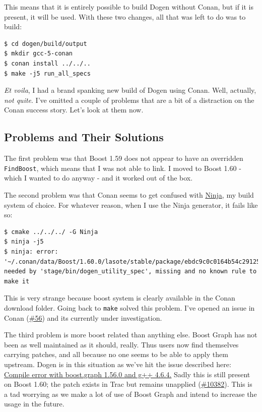 \documentclass{book}
\begin{document}
This means that it is entirely possible to build Dogen without Conan,
but if it is present, it will be used. With these two changes, all
that was left to do was to build:

\begin{verbatim}
$ cd dogen/build/output
$ mkdir gcc-5-conan
$ conan install ../../..
$ make -j5 run_all_specs
\end{verbatim}

\emph{Et voila}, I had a brand spanking new build of Dogen using
Conan. Well, actually, \emph{not quite}. I've omitted a couple of problems
that are a bit of a distraction on the Conan success story. Let's look
at them now.

\subsection*{Problems and Their Solutions}
\label{sec-3-2}

The first problem was that Boost 1.59 does not appear to have an
overridden \texttt{FindBoost}, which means that I was not able to link. I
moved to Boost 1.60 - which I wanted to do anyway - and it worked out
of the box.

The second problem was that Conan seems to get confused with \href{https://ninja-build.org/manual.html}{Ninja}, my
build system of choice. For whatever reason, when I use the Ninja
generator, it fails like so:

\begin{verbatim}
$ cmake ../../../ -G Ninja
$ ninja -j5
$ ninja: error: '~/.conan/data/Boost/1.60.0/lasote/stable/package/ebdc9c0c0164b54c29125127c75297f6607946c5/lib/libboost_system.so', needed by 'stage/bin/dogen_utility_spec', missing and no known rule to make it
\end{verbatim}

This is very strange because boost system is clearly available in the
Conan download folder. Going back to \texttt{make} solved this problem. I've
opened an issue in Conan (\href{https://github.com/conan-io/conan/issues/56}{\#56}) and its currently under investigation.

The third problem is more boost related than anything else. Boost
Graph has not been as well maintained as it should, really. Thus users
now find themselves carrying patches, and all because no one seems to
be able to apply them upstream. Dogen is in this situation as we've
hit the issue described here: \href{http://stackoverflow.com/questions/25395805/compile-error-with-boost-graph-1-56-0-and-g-4-6-4}{Compile error with boost.graph 1.56.0
and g++ 4.6.4.} Sadly this is still present on Boost 1.60; the patch
exists in Trac but remains unapplied (\href{https://svn.boost.org/trac/boost/ticket/10382}{\#10382}). This is a tad worrying
as we make a lot of use of Boost Graph and intend to increase the
usage in the future.
\end{document}
